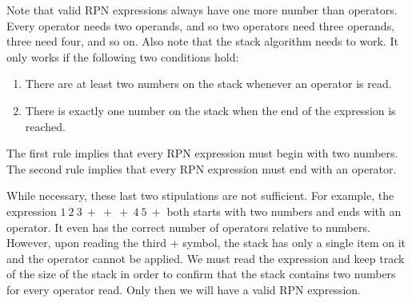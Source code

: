 \documentclass[twocolumn]{iagproc}
\begin{document}
Note that valid RPN expressions always have one more number than operators.
Every operator needs two operands, and so two operators need three operands, three need four, and so on.
Also note that the stack algorithm needs to work.
It only works if the following two conditions hold:
\begin{enumerate}
  \item There are at least two numbers on the stack whenever an operator is read.
  \item There is exactly one number on the stack when the end of the expression is reached.
\end{enumerate}
The first rule implies that every RPN expression must begin with two numbers.
The second rule implies that every RPN expression must end with an operator.

While necessary, these last two stipulations are not sufficient.
For example, the expression $1 \ 2 \ 3 \ + \ + \ + \ 4 \ 5 \ +$ both starts with two numbers and ends with an operator.
It even has the correct number of operators relative to numbers.
However, upon reading the third $+$ symbol, the stack has only a single item on it and the operator cannot be applied.
We must read the expression and keep track of the size of the stack in order to confirm that the stack contains two numbers for every operator read.
Only then we will have a valid RPN expression.


%
%
\end{document}
